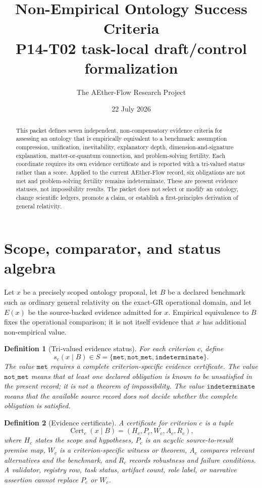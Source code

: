 \documentclass[11pt]{article}
\title{Non-Empirical Ontology Success Criteria\\
\large P14-T02 task-local draft/control formalization}
\author{The AEther-Flow Research Project}
\date{22 July 2026}
\newtheorem{definition}{Definition}
\newcommand{\Met}{\texttt{met}}
\newcommand{\NotMet}{\texttt{not\_met}}
\newcommand{\Indet}{\texttt{indeterminate}}
\begin{document}
\maketitle

\begin{abstract}
This packet defines seven independent, non-compensatory evidence criteria for
assessing an ontology that is empirically equivalent to a benchmark:
assumption compression, unification, inevitability, explanatory depth,
dimension-and-signature explanation, matter-or-quantum connection, and
problem-solving fertility.  Each coordinate requires its own evidence
certificate and is reported with a tri-valued status rather than a score.
Applied to the current AEther-Flow record, six obligations are not met and
problem-solving fertility remains indeterminate.  These are present evidence
statuses, not impossibility results.  The packet does not select or modify an
ontology, change scientific ledgers, promote a claim, or establish a
first-principles derivation of general relativity.
\end{abstract}

\section{Scope, comparator, and status algebra}

Let \(x\) be a precisely scoped ontology proposal, let \(B\) be a declared
benchmark such as ordinary general relativity on the exact-GR operational
domain, and let \(E(x)\) be the source-backed evidence admitted for \(x\).
Empirical equivalence to \(B\) fixes the operational comparison; it is not
itself evidence that \(x\) has additional non-empirical value.

\begin{definition}[Tri-valued evidence status]
For each criterion \(c\), define
\[
 s_c(x\mid B)\in
 S=\{\Met,\NotMet,\Indet\}.
\]
The value \(\Met\) requires a complete criterion-specific evidence
certificate.  The value \(\NotMet\) means that at least one declared
obligation is known to be unsatisfied in the present record; it is not a theorem of impossibility.
The value \(\Indet\) means that the available
source record does not decide whether the complete obligation is satisfied.
\end{definition}

\begin{definition}[Evidence certificate]
A certificate for criterion \(c\) is a tuple
\[
 \operatorname{Cert}_{c}(x\mid B)
   =(H_c,P_c,W_c,A_c,R_c),
\]
where \(H_c\) states the scope and hypotheses, \(P_c\) is an acyclic
source-to-result premise map, \(W_c\) is a criterion-specific witness or
theorem, \(A_c\) compares relevant alternatives and the benchmark, and
\(R_c\) records robustness and failure conditions.  A validator, registry
row, task status, artifact count, role label, or narrative assertion cannot
replace \(P_c\) or \(W_c\).
\end{definition}
\end{document}
